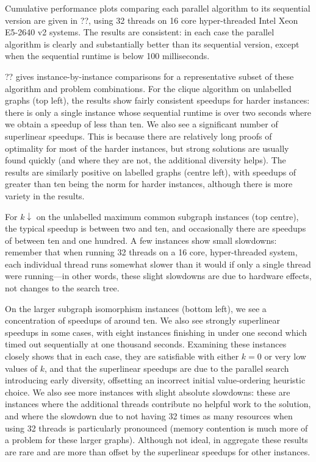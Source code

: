 \documentclass[sigconf]{acmart}
\begin{document}
Cumulative performance plots comparing each parallel algorithm to its sequential version are given
in ??, using 32 threads on 16 core hyper-threaded Intel Xeon
E5-2640 v2 systems. The results are consistent: in each case the parallel algorithm is clearly and
substantially better than its sequential version, except when the sequential runtime is below 100
milliseconds.

?? gives instance-by-instance comparisons for a representative subset of
these algorithm and problem combinations. For the clique algorithm on unlabelled graphs (top left),
the results show fairly consistent speedups for harder instances: there is only a single instance
whose sequential runtime is over two seconds where we obtain a speedup of less than ten. We also see
a significant number of superlinear speedups. This is because there are relatively long proofs of
optimality for most of the harder instances, but strong solutions are usually found quickly (and
where they are not, the additional diversity helps). The results are similarly positive on
labelled graphs (centre left), with speedups of greater than ten being the norm for harder
instances, although there is more variety in the results.

For $k{\downarrow}$ on the unlabelled maximum common subgraph instances (top centre), the typical speedup
is between two and ten, and occasionally there are speedups of between ten and one hundred. A few
instances show small slowdowns: remember that when running 32 threads on a 16 core, hyper-threaded
system, each individual thread runs somewhat slower than it would if only a single thread were
running---in other words, these slight slowdowns are due to hardware effects, not changes to the
search tree.

On the larger subgraph isomorphism instances (bottom left), we see a concentration of speedups
of around ten. We also see strongly superlinear speedups in some cases, with eight
instances finishing in under one second which timed out sequentially at one thousand seconds.
Examining these instances closely shows that in each case, they are satisfiable with either $k = 0$
or very low values of $k$, and that the superlinear speedups are due to the parallel search
introducing early diversity, offsetting an incorrect initial value-ordering heuristic choice. We
also see more instances with slight absolute slowdowns: these are instances where the additional
threads contribute no helpful work to the solution, and where the slowdown due to not having 32
times as many resources when using 32 threads is particularly pronounced (memory contention is much
more of a problem for these larger graphs). Although not ideal, in aggregate these results are rare
and are more than offset by the superlinear speedups for other instances.
\end{document}
